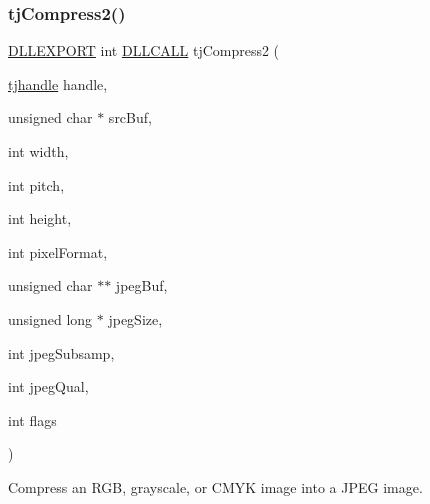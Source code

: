 \mbox{\label{group___turbo_j_p_e_g_gaba62b7a98f960839b588579898495cf2}} 
\subsubsection{\texorpdfstring{tj\+Compress2()}{tjCompress2()}}
{\footnotesize\ttfamily \hyperlink{turbojpeg_8h_a808e08638be3cba36e36759e5b150de0}{D\+L\+L\+E\+X\+P\+O\+RT} int \hyperlink{turbojpeg_8h_a54b25836118bfac94a53a7b790f3ccb2}{D\+L\+L\+C\+A\+LL} tj\+Compress2 (\begin{DoxyParamCaption}\item[{\hyperlink{group___turbo_j_p_e_g_ga758d2634ecb4949de7815cba621f5763}{tjhandle}}]{handle,  }\item[{unsigned char $\ast$}]{src\+Buf,  }\item[{int}]{width,  }\item[{int}]{pitch,  }\item[{int}]{height,  }\item[{int}]{pixel\+Format,  }\item[{unsigned char $\ast$$\ast$}]{jpeg\+Buf,  }\item[{unsigned long $\ast$}]{jpeg\+Size,  }\item[{int}]{jpeg\+Subsamp,  }\item[{int}]{jpeg\+Qual,  }\item[{int}]{flags }\end{DoxyParamCaption})}

Compress an R\+GB, grayscale, or C\+M\+YK image into a J\+P\+EG image.


